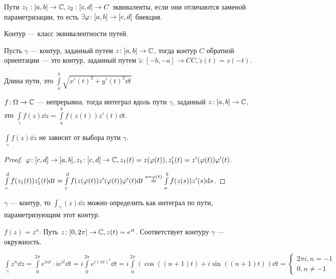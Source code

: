 \begin{definition}
    Пути $z_1: [a, b] \to \mathbb{C}, z_2: [c,d] \to C$ эквиваленты, если они отличаются заменой параметризации, то есть $\exists \varphi\!:[a, b] \to [c,d]$ биекция.
\end{definition}
\begin{definition}
    Контур --- класс эквивалентности путей.
\end{definition}
\begin{definition}
    Пусть $\gamma$ --- контур, заданный путем  $z\!: [a, b] \to \mathbb{C}$, тогда контур  $C$ обратной ориентации --- это контур, заданный путем  $\widetilde{z}\!: [-b, -a] \to CC, \widetilde{z}(t) = z(-t)$.
\end{definition}
\begin{definition}
    Длина пути, это $\int\limits_a^b \sqrt{x'(t)^2 + y'(t)^2 \dd{t}}$
\end{definition}
\begin{definition}
    $f\!: \Omega \to \mathbb{C}$ --- непрерывна, тогда интеграл вдоль пути  $\gamma$, заданный $z\!: [a, b] \to \mathbb{C}$, это  $\int\limits_{\gamma} f(z)\dd{z} = \int\limits_a^b f(z(t))z'(t)\dd{t}$.
\end{definition}
\begin{statement}
    $\int\limits_{\gamma} f(z) \dd{z}$ не зависит от выбора пути  $\gamma$.
\end{statement}
\begin{proof}
    $\varphi\!: [c,d] \to [a, b], z_1\!: [c,d] \to \mathbb{C}, z_1(t) = z(\varphi(t)), z_1'(t) = z'(\varphi(t))\varphi'(t)$.

    $\int\limits_c^d f(z_1(t))z_1'(t) \mathrm{d}t = \int\limits_c^d f(z(\varphi(t)) z'(\varphi(t)) \varphi'(t) \mathrm{d}t \overset{s=\varphi(t)}{=} \int\limits_a^b f(z(s))z'(s) \mathrm{d}s$.
\end{proof}
\begin{consequence}
    $\gamma$ --- контур, то  $\int_{\gamma} (z) \dd{z}$ можно определить как интеграл по пути, параметризующим этот контур.
\end{consequence}
\begin{example}
    $f(z) = z^n$. Путь  $z\!: [0, 2\pi] \to \mathbb{C}, z(t) = e^{it}$. Соответствует контуру $\gamma$ --- окружность.

    $\int\limits_{\gamma}z^n \dd{z} = \int\limits_0^{2\pi} e^{i nt} \cdot i e^{it} \dd{t} = i\int\limits_0^{2\pi}e^{i(nt)^t}\dd{t} = i\int\limits_0^{2\pi}\left( \cos((n+1)t) + i\sin\left( (n+1)t \right)  \right) \dd{t} = \begin{cases}
        2\pi i, n = -1\\
        0, n \neq -1
    \end{cases}$
\end{example}
